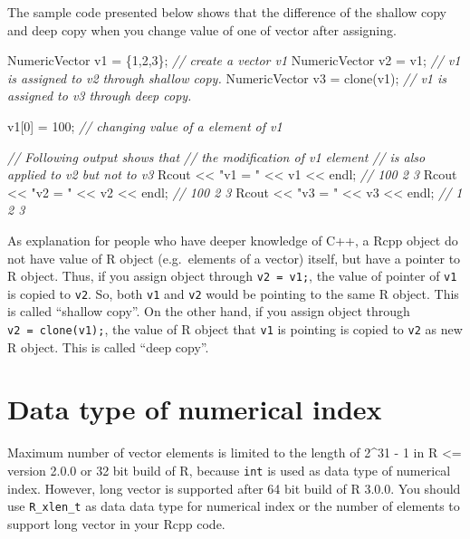 \documentclass[]{book}
\newenvironment{Shaded}{\begin{snugshade}}{\end{snugshade}}
\newcommand{\DecValTok}[1]{\textcolor[rgb]{0.00,0.00,0.81}{#1}}
\newcommand{\StringTok}[1]{\textcolor[rgb]{0.31,0.60,0.02}{#1}}
\newcommand{\CommentTok}[1]{\textcolor[rgb]{0.56,0.35,0.01}{\textit{#1}}}
\newcommand{\NormalTok}[1]{#1}
\theoremstyle{definition}
\theoremstyle{definition}
\theoremstyle{remark}
\begin{document}
The sample code presented below shows that the difference of the shallow
copy and deep copy when you change value of one of vector after
assigning.

\begin{Shaded}
\begin{Highlighting}[]
\NormalTok{NumericVector v1 = \{}\DecValTok{1}\NormalTok{,}\DecValTok{2}\NormalTok{,}\DecValTok{3}\NormalTok{\};   }\CommentTok{// create a vector v1}
\NormalTok{NumericVector v2 = v1;        }\CommentTok{// v1 is assigned to v2 through shallow copy.}
\NormalTok{NumericVector v3 = clone(v1); }\CommentTok{// v1 is assigned to v3 through deep copy.}

\NormalTok{v1[}\DecValTok{0}\NormalTok{] = }\DecValTok{100}\NormalTok{; }\CommentTok{// changing value of a element of v1}

\CommentTok{// Following output shows that}
\CommentTok{// the modification of v1 element}
\CommentTok{// is also applied to v2 but not to v3}
\NormalTok{Rcout << }\StringTok{"v1 = "}\NormalTok{ << v1 << endl; }\CommentTok{// 100 2 3}
\NormalTok{Rcout << }\StringTok{"v2 = "}\NormalTok{ << v2 << endl; }\CommentTok{// 100 2 3}
\NormalTok{Rcout << }\StringTok{"v3 = "}\NormalTok{ << v3 << endl; }\CommentTok{// 1 2 3}
\end{Highlighting}
\end{Shaded}

As explanation for people who have deeper knowledge of C++, a Rcpp
object do not have value of R object (e.g.~elements of a vector) itself,
but have a pointer to R object. Thus, if you assign object through
\texttt{v2\ =\ v1;}, the value of pointer of \texttt{v1} is copied to
\texttt{v2}. So, both \texttt{v1} and \texttt{v2} would be pointing to
the same R object. This is called ``shallow copy''. On the other hand,
if you assign object through \texttt{v2\ =\ clone(v1);}, the value of R
object that \texttt{v1} is pointing is copied to \texttt{v2} as new R
object. This is called ``deep copy''.

\section{Data type of numerical
index}\label{data-type-of-numerical-index}

Maximum number of vector elements is limited to the length of 2\^{}31 -
1 in R \textless{}= version 2.0.0 or 32 bit build of R, because
\texttt{int} is used as data type of numerical index. However, long
vector is supported after 64 bit build of R 3.0.0. You should use
\texttt{R\_xlen\_t} as data data type for numerical index or the number
of elements to support long vector in your Rcpp code.
\end{document}
